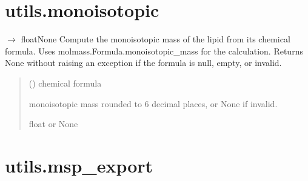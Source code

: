 \documentclass[letterpaper,10pt,english]{sphinxmanual}
\begin{document}
\section{utils.monoisotopic}
\label{\detokenize{api:module-utils.monoisotopic}}\label{\detokenize{api:utils-monoisotopic}}

\begin{fulllineitems}
\label{\detokenize{api:utils.monoisotopic.monoisotopic_mass}}
\pysigstartsignatures
\pysiglinewithargsret
{}
{}
{{ $\rightarrow$ floatNone}}
\pysigstopsignatures
\sphinxAtStartPar
Compute the monoisotopic mass of the lipid from its chemical formula.
Uses molmass.Formula.monoisotopic\_mass for the calculation.
Returns None without raising an exception if the formula is null, empty, or invalid.
\begin{quote}\begin{description}
\sphinxAtStartPar
{} () \textendash{} chemical formula

\sphinxAtStartPar
monoisotopic mass rounded to 6 decimal places, or None if invalid.

\sphinxAtStartPar
float or None

\end{description}\end{quote}

\end{fulllineitems}



\section{utils.msp\_export}
\label{\detokenize{api:module-utils.msp_export}}\label{\detokenize{api:utils-msp-export}}
\end{document}
